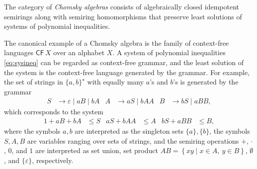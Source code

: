 \documentclass[copyright,creativecommons]{eptcs}
\theoremstyle{remark}
\newcommand\fun{\mathrel\rightarrow}
\newcommand\eps\varepsilon
\newcommand\set[2]{\left\{#1\mid #2\right\}}
\newcommand\mathname[1]{\ensuremath{\mathsf{#1}}}
\newcommand\cset[1]{\{#1\}}
\newcommand\CFname{\mathname{CF}}
\newcommand\CF[1]{\CFname\,#1}
\newcommand\Tname{\mathname{T}}
\newcommand\T[1]{\Tname\,#1}
\newcommand{\fhcomment}[1]{\textcolor{red}{[\textbf{Comment (FH)}: {#1}]}}
\newcommand{\dkcomment}[1]{\textcolor{blue}{[\textbf{Comment (DK)}: {#1}]}}
\renewcommand{\fhcomment}[1]{}
\renewcommand{\dkcomment}[1]{}
\begin{document}
The category of \emph{Chomsky algebras} consists of algebraically closed idempotent semirings along with semiring homomorphisms that preserve least solutions of systems of polynomial inequalities.
\fhcomment{Add: Definition of what exactly this means.}\dkcomment{I didn't do this because it is more or less obvious what we mean, but clunky (and not too instructive) to write down formally, and we don't really use it anywhere. It would have been moot if we had started off with $\mu$-expressions in our language, because homomorphisms would have to preserve $\mu$. But I like our formulation better because it is closer in spirit to the definition of algebraically closed fields. The corresponding statement in fields is that automorphisms preserve roots of polynomials. Formally, a Chomsky algebra morphism is a semiring homomorphism $h:C\fun D$ such that if $h':C[X]\fun D[X]$ is the unique extension of $h$ such that $h'(x)=x$, and if $\sigma$ is the least solution to the system $p_i\leq x_i$, $\onein$, then $h\circ\sigma$ is the least solution to the system $h'(p_i)\leq x_i$, $\onein$.}\fhcomment{Okay.  A reader might be interested anyway, given 
it's mentioned to start with.  Going with both $\E X$ and $\T X$ as expressions in this paper could 
save space, I believe, and leave an proper algebraic treatment of $\mu$ as
extension to $C[X]$ as something for later.  What do you think?}

The canonical example of a Chomsky algebra is the family of context-free languages $\CF X$ over an alphabet $X$. A system of polynomial inequalities \eqref{eq:sysineq} can be regarded as context-free grammar, and the least solution of the system is the context-free language generated by the grammar. For example, the set of strings in $\{a,b\}^\star$ with equally many $a$'s and $b$'s is generated by the grammar
\begin{align}
S &\fun \eps \mid aB \mid bA & A &\fun aS \mid bAA & B &\fun bS \mid aBB,\label{ex:Greibach1}
\end{align}
which corresponds to the system
\begin{align}
1+aB+bA &\leq S & aS+bAA &\leq A & bS+aBB &\leq B,\label{ex:Greibach2}
\end{align}
where the symbols $a,b$ are interpreted as the singleton sets $\cset a,\cset b$, the symbols $S,A,B$ are variables ranging over sets of strings, and the semiring operations $+$, $\cdot$, $0$, and $1$ are interpreted as set union, set product $AB = \set{xy}{x\in A,\ y\in B}$, $\emptyset$, and $\cset\eps$, respectively.
 
\end{document}
